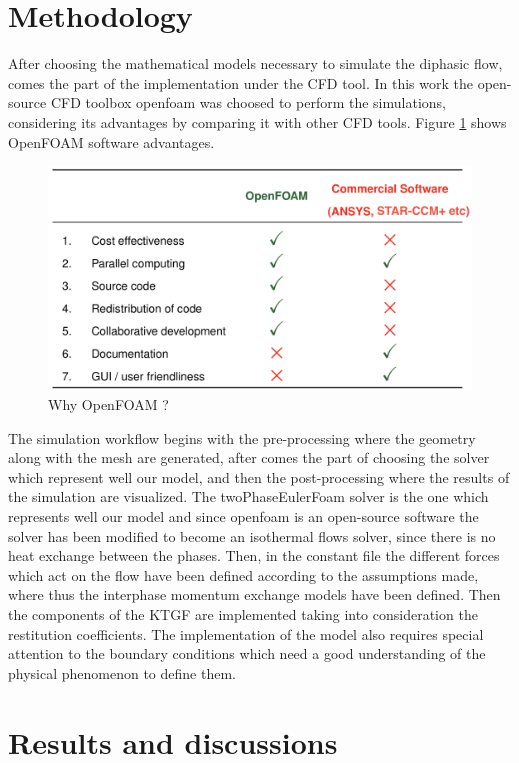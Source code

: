 \documentclass[review,3p,times,12pt]{elsarticle}
\begin{document}
\section{Methodology}
After choosing the mathematical models necessary to simulate the diphasic flow, comes the part of the implementation under the CFD tool. In this work the open-source CFD toolbox openfoam was choosed to perform the simulations, considering its advantages by comparing it with other CFD tools. Figure \ref{openfoam} shows OpenFOAM software advantages.\\
\begin{figure}[H]
\begin{center}
%
\includegraphics[trim=0cm 0cm 0cm 0cm,clip,scale=0.45]{figs/0F2.png}
\caption{ Why OpenFOAM ?}
\label{openfoam}
\end{center}
\end{figure} 
The simulation workflow begins with the pre-processing where the geometry along with the mesh are generated, after comes the part of choosing the solver which represent well our model, and then the post-processing where the results of the simulation are visualized.
The twoPhaseEulerFoam solver is the one which represents well our model and since openfoam is an open-source software the solver has been modified to become an isothermal flows solver, since there is no heat exchange between the phases. Then, in the constant file the different forces which act on the flow have been defined according to the assumptions made, where thus the interphase momentum exchange models have been defined. Then the components of the KTGF are implemented taking into consideration the restitution coefficients. The implementation of the model also requires special attention to the boundary conditions which need a good understanding of the physical phenomenon to define them.
\section{Results and discussions} \label{results}
\end{document}
